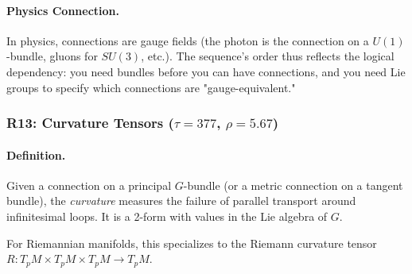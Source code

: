 \documentclass[11pt]{article}
\theoremstyle{definition}
\begin{document}
\paragraph{Physics Connection.}
In physics, connections are gauge fields (the photon is the connection on a $U(1)$-bundle, gluons for $SU(3)$, etc.). The sequence's order thus reflects the logical dependency: you need bundles before you can have connections, and you need Lie groups to specify which connections are "gauge-equivalent."

\subsubsection{R13: Curvature Tensors ($\tau=377$, $\rho=5.67$)}

\paragraph{Definition.}
Given a connection on a principal $G$-bundle (or a metric connection on a tangent bundle), the \emph{curvature} measures the failure of parallel transport around infinitesimal loops. It is a 2-form with values in the Lie algebra of $G$.

For Riemannian manifolds, this specializes to the Riemann curvature tensor $R : T_pM \times T_pM \times T_pM \to T_pM$.
\end{document}
